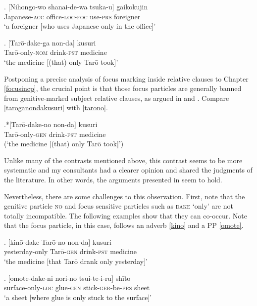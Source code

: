 \documentclass [output=book,colorlinks,citecolor=brown]{langscibook}
\begin{document}
\exg. [Nihongo-wo shanai-de-wa tsuka-u] gaikokujin\\
Japanese-\textsc{acc} office-\textsc{loc}-\textsc{foc} use-\textsc{prs} foreigner\\
`a foreigner [who uses Japanese only in the office]’ \label{shanai} \\ \null \hfill \citep[93]{akaso:2011:on} \label{shanai-de}

\exg. [Tarō-dake-ga non-da] kusuri\\
Tarō-only-\textsc{nom} drink-\textsc{pst} medicine\\
`the medicine [(that) only Tarō took]’ \null \hfill \citep[96]{akaso:2011:on} \label{taroganondakusuri}

Postponing a precise analysis of focus marking inside relative clauses to Chapter \ref{focusincp}, the crucial point is that those focus particles are generally banned from genitive-marked subject relative clauses, as argued in \citet{akaso:2011:on} and \citet{miyagawa:2017:agreement}. Compare \ref{taroganondakusuri} with \ref{tarono}. %

\exg.*[Tarō-dake-no non-da] kusuri \label{kusuri} \\
Tarō-only-\textsc{gen} drink-\textsc{pst} medicine\\
(`the medicine [(that) only Tarō took]’) \null \hfill \citep[96]{akaso:2011:on} \label{tarono}

Unlike many of the contrasts mentioned above, this contrast seems to be more systematic and my consultants had a clearer opinion and shared the judgments of the literature. In other words, the arguments presented in \citet{miyagawa:2017:agreement} seem to hold.

Nevertheless, there are some challenges to this observation. First, note that the genitive particle \textsc{no} and focus sensitive particles such as \textsc{dake} `only' are not totally incompatible. The following examples show that they can co-occur. Note that the focus particle, in this case, follows an adverb \ref{kino} and a PP \ref{omote}.

\exg. [kinō-dake Tarō-no non-da] kusuri\\
yesterday-only Tarō-\textsc{gen} drink-\textsc{pst} medicine\\
`the medicine [that Tarō drank only yesterday]’ \null \hfill \citep[692]{ochi:2017:ga} \label{kino}

\exg. [omote-dake-ni nori-no tsui-te-i-ru] shīto\\
surface-only-\textsc{loc} glue-\textsc{gen} stick-\textsc{ger}-be-\textsc{prs} sheet\\
`a sheet [where glue is only stuck to the surface]’ \label{omote}
\end{document}
